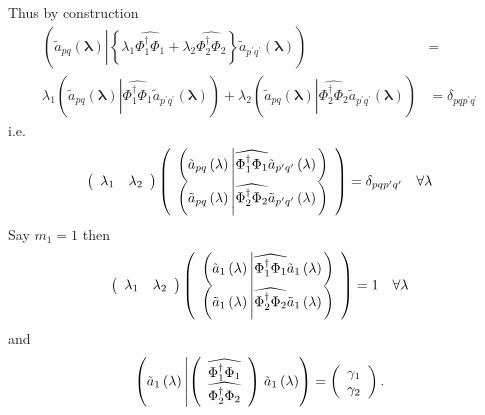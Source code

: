 \documentclass[aps,preprint]{revtex4}%
\begin{document}
Thus by construction
\begin{align}
\left(  \tilde{a}_{pq}\left(  \mathbf{\lambda}\right)  \left\vert \left\{
\lambda_{1}\widehat{\Phi_{1}^{\dagger}\Phi_{1}}+\lambda_{2}\widehat{\Phi
_{2}^{\dagger}\Phi_{2}}\right\}  \tilde{a}_{p^{\prime}q^{\prime}}\left(
\mathbf{\lambda}\right)  \right.  \right)   &  =\\
\lambda_{1}\left(  \tilde{a}_{pq}\left(  \mathbf{\lambda}\right)  \left\vert
\widehat{\Phi_{1}^{\dagger}\Phi_{1}}\tilde{a}_{p^{\prime}q^{\prime}}\left(
\mathbf{\lambda}\right)  \right.  \right)  +\lambda_{2}\left(  \tilde{a}%
_{pq}\left(  \mathbf{\lambda}\right)  \left\vert \widehat{\Phi_{2}^{\dagger
}\Phi_{2}}\tilde{a}_{p^{\prime}q^{\prime}}\left(  \mathbf{\lambda}\right)
\right.  \right)   &  =\delta_{pqp^{\prime}q^{\prime}}%
\end{align}
i.e.
\begin{equation}
\left(
\begin{array}
[c]{cc}%
\lambda_{1} & \lambda_{2}%
\end{array}
\right)  \left(
\begin{array}
[c]{c}%
\left(  \tilde{a}_{pq}\left(  \mathbf{\lambda}\right)  \left\vert
\widehat{\Phi_{1}^{\dagger}\Phi_{1}}\tilde{a}_{p^{\prime}q^{\prime}}\left(
\mathbf{\lambda}\right)  \right.  \right) \\
\left(  \tilde{a}_{pq}\left(  \mathbf{\lambda}\right)  \left\vert
\widehat{\Phi_{2}^{\dagger}\Phi_{2}}\tilde{a}_{p^{\prime}q^{\prime}}\left(
\mathbf{\lambda}\right)  \right.  \right)
\end{array}
\right)  =\delta_{pqp^{\prime}q^{\prime}}\quad\forall\mathbf{\lambda}%
\end{equation}
Say $m_{1}=1$ then
\begin{equation}
\left(
\begin{array}
[c]{cc}%
\lambda_{1} & \lambda_{2}%
\end{array}
\right)  \left(
\begin{array}
[c]{c}%
\left(  \tilde{a}_{1}\left(  \mathbf{\lambda}\right)  \left\vert
\widehat{\Phi_{1}^{\dagger}\Phi_{1}}\tilde{a}_{1}\left(  \mathbf{\lambda
}\right)  \right.  \right) \\
\left(  \tilde{a}_{1}\left(  \mathbf{\lambda}\right)  \left\vert
\widehat{\Phi_{2}^{\dagger}\Phi_{2}}\tilde{a}_{1}\left(  \mathbf{\lambda
}\right)  \right.  \right)
\end{array}
\right)  =1\quad\forall\mathbf{\lambda}%
\end{equation}
and
\begin{equation}
\left(  \tilde{a}_{1}\left(  \mathbf{\lambda}\right)  \left\vert \left(
\begin{array}
[c]{c}%
\widehat{\Phi_{1}^{\dagger}\Phi_{1}}\\
\widehat{\Phi_{2}^{\dagger}\Phi_{2}}%
\end{array}
\right)  \right.  \tilde{a}_{1}\left(  \mathbf{\lambda}\right)  \right)
=\left(
\begin{array}
[c]{c}%
\gamma_{1}\\
\gamma_{2}%
\end{array}
\right)  .
\end{equation}
\end{document}
